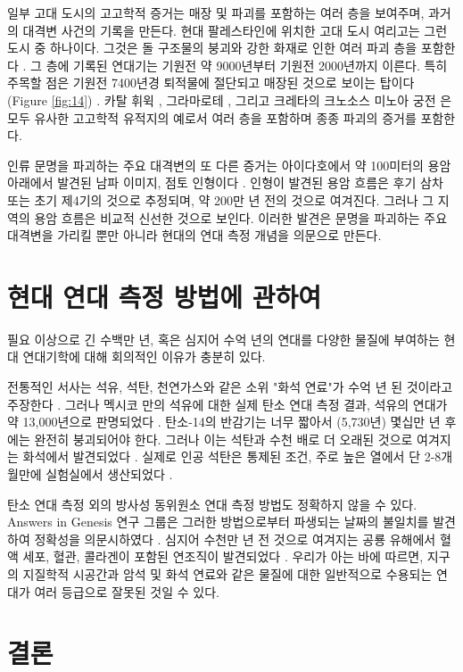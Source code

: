 \documentclass[10pt,twocolumn,letterpaper]{article}
\begin{document}
일부 고대 도시의 고고학적 증거는 매장 및 파괴를 포함하는 여러 층을 보여주며, 과거의 대격변 사건의 기록을 만든다. 현대 팔레스타인에 위치한 고대 도시 여리고는 그런 도시 중 하나이다. 그것은 돌 구조물의 붕괴와 강한 화재로 인한 여러 파괴 층을 포함한다 \cite{96,97}. 그 층에 기록된 연대기는 기원전 약 9000년부터 기원전 2000년까지 이른다. 특히 주목할 점은 기원전 7400년경 퇴적물에 절단되고 매장된 것으로 보이는 탑이다 (Figure \ref{fig:14}) \cite{95}. 카탈 휘윅 \cite{99}, 그라마로테 \cite{98}, 그리고 크레타의 크노소스 미노아 궁전 \cite{100,101}은 모두 유사한 고고학적 유적지의 예로서 여러 층을 포함하며 종종 파괴의 증거를 포함한다.

인류 문명을 파괴하는 주요 대격변의 또 다른 증거는 아이다호에서 약 100미터의 용암 아래에서 발견된 남파 이미지, 점토 인형이다 \cite{102,103}. 인형이 발견된 용암 흐름은 후기 삼차 또는 초기 제4기의 것으로 추정되며, 약 200만 년 전의 것으로 여겨진다. 그러나 그 지역의 용암 흐름은 비교적 신선한 것으로 보인다. 이러한 발견은 문명을 파괴하는 주요 대격변을 가리킬 뿐만 아니라 현대의 연대 측정 개념을 의문으로 만든다.

\section{현대 연대 측정 방법에 관하여}

필요 이상으로 긴 수백만 년, 혹은 심지어 수억 년의 연대를 다양한 물질에 부여하는 현대 연대기학에 대해 회의적인 이유가 충분히 있다.

전통적인 서사는 석유, 석탄, 천연가스와 같은 소위 "화석 연료"가 수억 년 된 것이라고 주장한다 \cite{104}. 그러나 멕시코 만의 석유에 대한 실제 탄소 연대 측정 결과, 석유의 연대가 약 13,000년으로 판명되었다 \cite{105}. 탄소-14의 반감기는 너무 짧아서 (5,730년) 몇십만 년 후에는 완전히 붕괴되어야 한다. 그러나 이는 석탄과 수천 배로 더 오래된 것으로 여겨지는 화석에서 발견되었다 \cite{106}. 실제로 인공 석탄은 통제된 조건, 주로 높은 열에서 단 2-8개월만에 실험실에서 생산되었다 \cite{107}.

탄소 연대 측정 외의 방사성 동위원소 연대 측정 방법도 정확하지 않을 수 있다. Answers in Genesis 연구 그룹은 그러한 방법으로부터 파생되는 날짜의 불일치를 발견하여 정확성을 의문시하였다 \cite{108}. 심지어 수천만 년 전 것으로 여겨지는 공룡 유해에서 혈액 세포, 혈관, 콜라겐이 포함된 연조직이 발견되었다 \cite{109,110}. 우리가 아는 바에 따르면, 지구의 지질학적 시공간과 암석 및 화석 연료와 같은 물질에 대한 일반적으로 수용되는 연대가 여러 등급으로 잘못된 것일 수 있다.

\section{결론}
\end{document}
